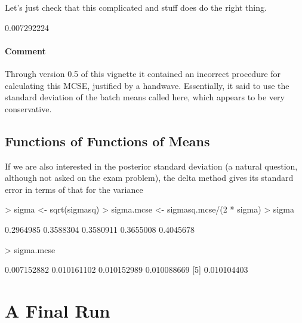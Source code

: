 \documentclass{article}
\begin{document}
Let's just check that this complicated \verb@sweep@ and \verb@apply@ stuff
does do the right thing.
\begin{Schunk}
\begin{Soutput}
[1] 0.007292224
\end{Soutput}
\end{Schunk}

\paragraph{Comment} Through version 0.5 of this vignette it contained
an incorrect procedure for calculating this MCSE, justified by a handwave.
Essentially, it said to use the standard deviation of the batch means called
\verb@v@ here, which appears to be very conservative.

\subsection{Functions of Functions of Means}

If we are also interested in the posterior standard deviation
(a natural question, although not asked on the exam problem),
the delta method gives its standard error in terms of that
for the variance
\begin{Schunk}
\begin{Sinput}
> sigma <- sqrt(sigmasq)
> sigma.mcse <- sigmasq.mcse/(2 * sigma)
> sigma
\end{Sinput}
\begin{Soutput}
[1] 0.2964985 0.3588304 0.3580911 0.3655008 0.4045678
\end{Soutput}
\begin{Sinput}
> sigma.mcse
\end{Sinput}
\begin{Soutput}
[1] 0.007152882 0.010161102 0.010152989 0.010088669
[5] 0.010104403
\end{Soutput}
\end{Schunk}

\section{A Final Run}
\end{document}

